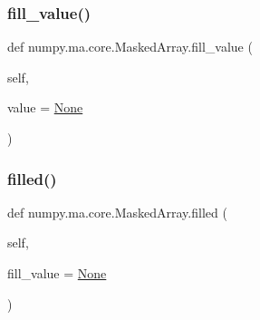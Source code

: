 \subsubsection{\texorpdfstring{fill\+\_\+value()}{fill\_value()}\hspace{0.1cm}{\footnotesize\ttfamily [2/2]}}
{\footnotesize\ttfamily def numpy.\+ma.\+core.\+Masked\+Array.\+fill\+\_\+value (\begin{DoxyParamCaption}\item[{}]{self,  }\item[{}]{value = {\ttfamily \hyperlink{namespacenumpy_1_1ma_1_1core_a647ee1848dfa3692fe35a663a2aa40b3}{None}} }\end{DoxyParamCaption})}

\mbox{\label{classnumpy_1_1ma_1_1core_1_1MaskedArray_ab7e6debaf70a8aa696a53a4498bb9b14}} 
\subsubsection{\texorpdfstring{filled()}{filled()}}
{\footnotesize\ttfamily def numpy.\+ma.\+core.\+Masked\+Array.\+filled (\begin{DoxyParamCaption}\item[{}]{self,  }\item[{}]{fill\+\_\+value = {\ttfamily \hyperlink{namespacenumpy_1_1ma_1_1core_a647ee1848dfa3692fe35a663a2aa40b3}{None}} }\end{DoxyParamCaption})}

